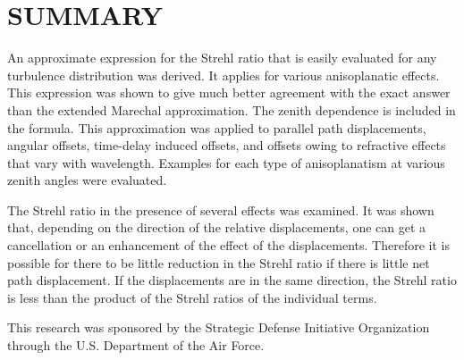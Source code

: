 \section{ SUMMARY}
\label{Su}
An approximate expression for the Strehl ratio that is  easily
evaluated for any turbulence distribution was derived.  It  applies
for various anisoplanatic effects.  This expression was shown to
give much better agreement with the exact answer than the extended
Marechal approximation.  The zenith dependence is included in the
formula.  This approximation was applied to parallel path
displacements,  angular offsets, time-delay induced offsets, and
offsets owing to  refractive effects that vary with wavelength.
Examples for each type of  anisoplanatism at various zenith angles
were evaluated.

The  Strehl ratio in the presence of several effects was examined.
It was  shown that, depending on the direction of the relative
displacements,  one can get a cancellation or an enhancement of the
effect of the  displacements.  Therefore it is possible for there
to be little  reduction in the Strehl ratio if there is little net
path displacement.   If the displacements are in the same
direction, the Strehl ratio is less  than the product of the Strehl
ratios of the individual terms.

\acknowledgments This research was  sponsored by the Strategic
Defense Initiative Organization through the  U.S. Department of the
Air Force.

